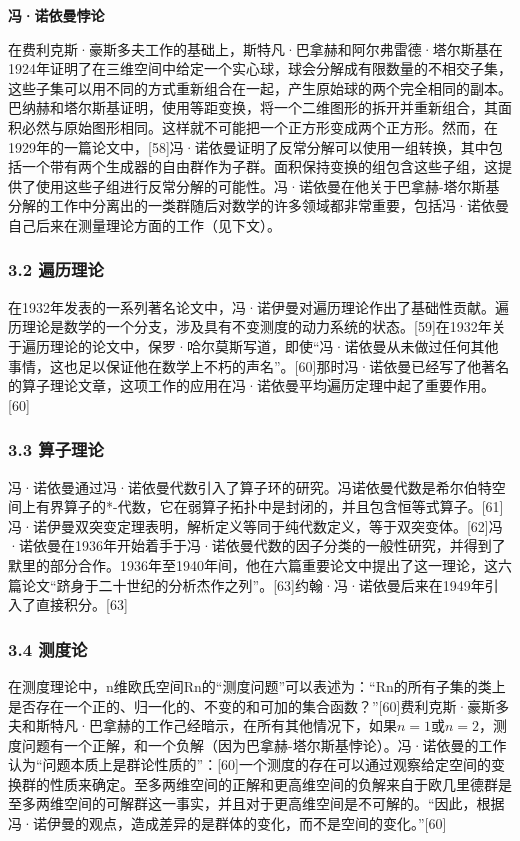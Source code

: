 \textbf{冯·诺依曼悖论}

在费利克斯·豪斯多夫工作的基础上，斯特凡·巴拿赫和阿尔弗雷德·塔尔斯基在1924年证明了在三维空间中给定一个实心球，球会分解成有限数量的不相交子集，这些子集可以用不同的方式重新组合在一起，产生原始球的两个完全相同的副本。巴纳赫和塔尔斯基证明，使用等距变换，将一个二维图形的拆开并重新组合，其面积必然与原始图形相同。这样就不可能把一个正方形变成两个正方形。然而，在1929年的一篇论文中，[58]冯·诺依曼证明了反常分解可以使用一组转换，其中包括一个带有两个生成器的自由群作为子群。面积保持变换的组包含这些子组，这提供了使用这些子组进行反常分解的可能性。冯·诺依曼在他关于巴拿赫-塔尔斯基分解的工作中分离出的一类群随后对数学的许多领域都非常重要，包括冯·诺依曼自己后来在测量理论方面的工作（见下文）。
\subsubsection{3.2 遍历理论}
在1932年发表的一系列著名论文中，冯·诺伊曼对遍历理论作出了基础性贡献。遍历理论是数学的一个分支，涉及具有不变测度的动力系统的状态。[59]在1932年关于遍历理论的论文中，保罗·哈尔莫斯写道，即使“冯·诺依曼从未做过任何其他事情，这也足以保证他在数学上不朽的声名”。[60]那时冯·诺依曼已经写了他著名的算子理论文章，这项工作的应用在冯·诺依曼平均遍历定理中起了重要作用。[60]
\subsubsection{3.3 算子理论}
冯·诺依曼通过冯·诺依曼代数引入了算子环的研究。冯诺依曼代数是希尔伯特空间上有界算子的*-代数，它在弱算子拓扑中是封闭的，并且包含恒等式算子。[61]冯·诺伊曼双突变定理表明，解析定义等同于纯代数定义，等于双突变体。[62]冯·诺依曼在1936年开始着手于冯·诺依曼代数的因子分类的一般性研究，并得到了默里的部分合作。1936年至1940年间，他在六篇重要论文中提出了这一理论，这六篇论文“跻身于二十世纪的分析杰作之列”。[63]约翰·冯·诺依曼后来在1949年引入了直接积分。[63]
\subsubsection{3.4 测度论}
在测度理论中，n维欧氏空间Rn的“测度问题”可以表述为：“Rn的所有子集的类上是否存在一个正的、归一化的、不变的和可加的集合函数？”[60]费利克斯·豪斯多夫和斯特凡·巴拿赫的工作己经暗示，在所有其他情况下，如果$n = 1$或$n = 2$，测度问题有一个正解，和一个负解（因为巴拿赫-塔尔斯基悖论）。冯·诺依曼的工作认为“问题本质上是群论性质的”：[60]一个测度的存在可以通过观察给定空间的变换群的性质来确定。至多两维空间的正解和更高维空间的负解来自于欧几里德群是至多两维空间的可解群这一事实，并且对于更高维空间是不可解的。“因此，根据冯·诺伊曼的观点，造成差异的是群体的变化，而不是空间的变化。”[60]


